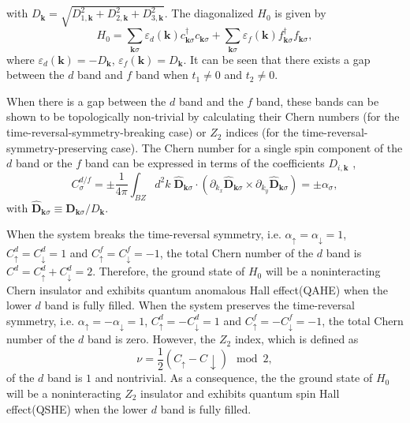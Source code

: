 \documentclass[amsmath,superscriptaddress,showpacs,aps,prb,twocolumn]{revtex4-1}
\begin{document}
with $D_{\mathbf{k}}=\sqrt{D^2_{1,\mathbf{k}}+D^2_{2,\mathbf{k}}+D^2_{3,\mathbf{k}}}$. The diagonalized $H_0$ is given by
\begin{equation}
H_{0}=\sum_{\mathbf{k}\sigma}\varepsilon_{d}(\mathbf{k})c^{\dagger}_{\mathbf{k}\sigma}c_{\mathbf{k}\sigma}
      +\sum_{\mathbf{k}\sigma}\varepsilon_{f}(\mathbf{k})f^{\dagger}_{\mathbf{k}\sigma}f_{\mathbf{k}\sigma},
\end{equation}
where $\varepsilon_{d}(\mathbf{k})=-D_{\mathbf{k}}$, $\varepsilon_{f}(\mathbf{k})=D_{\mathbf{k}}$. It can be seen that there exists a gap between the $d$ band and $f$ band when $t_1\ne0$ and $t_2\ne0$.
\par When there is a gap between the $d$ band and the $f$ band, these bands can be shown to be topologically non-trivial by calculating their Chern numbers \cite{TKNN_PRL1982} (for the time-reversal-symmetry-breaking case) or $Z_2$ indices \cite{KM_PRL2005b,SWSH_PRL2006} (for the time-reversal-symmetry-preserving case). The Chern number for a single spin component of the $d$ band or the $f$ band can be expressed in terms of the coefficients $D_{i,\mathbf{k}}$ \cite{HK_RMP2010,QZ_RMP2011},
\begin{equation}
C_{\sigma}^{d/f}=\pm\frac{1}{4\pi}\int_{BZ}d^{2}k\;
    \hat{\mathbf{D}}_{\mathbf{k}\sigma}\cdot(\partial_{k_{x}}\hat{\mathbf{D}}_{\mathbf{k}\sigma}\times\partial_{k_{y}}\hat{\mathbf{D}}_{\mathbf{k}\sigma})
    =\pm\alpha_\sigma,
\end{equation}
with $\hat{\mathbf{D}}_{\mathbf{k}\sigma}\equiv\mathbf{D}_{\mathbf{k}\sigma}/D_{\mathbf{k}}$.
\par When the system breaks the time-reversal symmetry, i.e. $\alpha_\uparrow=\alpha_\downarrow=1$, $C_\uparrow^d=C_\downarrow^d=1$ and $C_\uparrow^f=C_\downarrow^f=-1$, the total Chern number of the $d$ band is $C^d=C_\uparrow^d+C_\downarrow^d=2$. Therefore, the ground state of $H_0$ will be a noninteracting Chern insulator and exhibits quantum anomalous Hall effect(QAHE) when the lower $d$ band is fully filled. When the system preserves the time-reversal symmetry, i.e. $\alpha_\uparrow=-\alpha_\downarrow=1$, $C_\uparrow^d=-C_\downarrow^d=1$ and $C_\uparrow^f=-C_\downarrow^f=-1$, the total Chern number of the $d$ band is zero. However, the $Z_2$ index, which is defined as
\begin{equation}
\nu=\frac{1}{2}(C_{\uparrow}-C{\downarrow})\mod2,
\end{equation}
of the $d$ band is $1$ and nontrivial. As a consequence, the the ground state of $H_0$ will be a noninteracting $Z_2$ insulator and exhibits quantum spin Hall effect(QSHE) when the lower $d$ band is fully filled.
\end{document}
